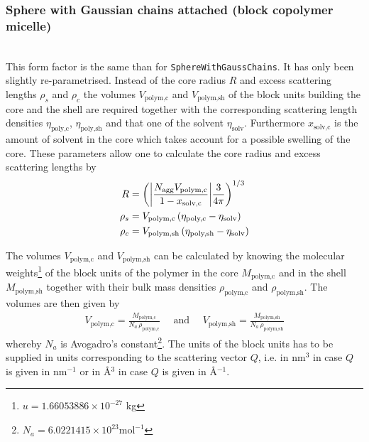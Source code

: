 \vspace{5mm}



\clearpage
\subsubsection{Sphere with Gaussian chains attached (block copolymer micelle)} ~\\

This form factor is the same than for \texttt{SphereWithGaussChains}. It has only been slightly re-parametrised.
Instead of the core radius $R$ and excess scattering lengths $\rho_s$ and $\rho_c$  the
volumes $V_\text{polym,c}$ and $V_\text{polym,sh}$ of the block units building the core and the shell are required
together with the corresponding scattering length densities $\eta_\text{poly,c}$, $\eta_\text{poly,sh}$ and
that one of the solvent $\eta_\text{solv}$. Furthermore $x_\text{solv,c}$ is the amount of solvent in the core which
takes account for a possible swelling of the core. These parameters allow one to calculate the core radius and
excess scattering lengths by
\begin{align}
    R &= \left({\left\vert \frac{N_\text{agg}V_\text{polym,c}}{1-x_\text{solv,c}}\right\vert} \frac{3}{4\pi}\right)^{1/3}   \\
    \rho_s &= V_\text{polym,c} \left(\eta_\text{poly,c}-\eta_\text{solv} \right) \\
    \rho_c &= V_\text{polym,sh} \left(\eta_\text{poly,sh}-\eta_\text{solv}\right)
\end{align}

The volumes $V_\text{polym,c}$ and $V_\text{polym,sh}$ can be calculated by knowing the molecular weights\footnote{$u=1.660 538 86 \times 10^{-27}$ kg}
of the block units of the polymer in the core $M_\text{polym,c}$ and in the shell $M_\text{polym,sh}$ together
with their bulk mass densities $\rho_\text{polym,c}$ and $\rho_\text{polym,sh}$. The volumes are then
given by
\begin{align}
V_\text{polym,c} = \frac{M_\text{polym,c}}{N_a\, \rho_\text{polym,c}}
\quad \text{ and } \quad
V_\text{polym,sh} = \frac{M_\text{polym,sh}}{N_a\, \rho_\text{polym,sh}}
\end{align}
whereby $N_a$ is Avogadro's constant\footnote{$N_a = 6.022 1415 \times 10^{23} \text{mol}^{-1}$}. The units of the block units
has to be supplied in units corresponding to the scattering vector $Q$, i.e. in nm$^3$ in case $Q$ is given in nm$^{-1}$
or in \AA$^3$ in case $Q$ is given in \AA$^{-1}$.
\vspace{5mm}

